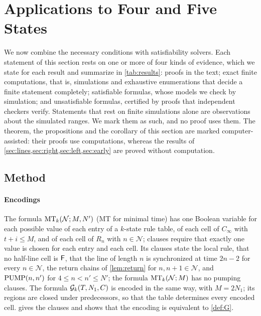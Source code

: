 \section{Applications to Four and Five States}\label{sec:applications}

We now combine the necessary conditions with satisfiability solvers. Each
statement of this section rests on one or more of four kinds of evidence, which
we state for each result and summarize in \cref{tab:results}: proofs in the
text; exact finite computations, that is, simulations and exhaustive
enumerations that decide a finite statement completely; satisfiable formulas,
whose models we check by simulation; and unsatisfiable formulas, certified by
proofs that independent checkers verify. Statements that rest on finite
simulations alone are observations about the simulated ranges. We mark them as
such, and no proof uses them. The theorem, the propositions and the corollary
of this section are marked computer-assisted: their proofs use computations,
whereas the results of \cref{sec:lines,sec:right,sec:left,sec:early} are
proved without computation.

\subsection{Method}\label{sec:method}

\paragraph{Encodings}
The formula $\mathrm{MT}_k(\mathcal N;M,N')$ (MT for minimal time) has one Boolean
variable for each possible value of each entry of a $k$-state rule table, of
each cell of $C_\infty$ with $t+i\le M$, and of each cell of $R_n$ with
$n\in\mathcal N$; clauses require that exactly one value is chosen for each
entry and each cell. Its clauses state the local rule, that no
half-line cell is $\mathsf F$, that the line of length $n$ is synchronized at time
$2n-2$ for every $n\in\mathcal N$, the return chains of \cref{lem:return} for
$n,n+1\in\mathcal N$, and $\mathrm{PUMP}(n,n')$ for $4\le n<n'\le N'$; the formula
$\mathrm{MT}_k(\mathcal N;M)$ has no pumping clauses. The formula $\mathcal G_k(T,N_1,C)$ is
encoded in the same way, with $M=2N_1$; its regions are closed under
predecessors, so that the table determines every encoded cell.
 gives the clauses and shows that the encoding is equivalent
to \cref{def:G}.

